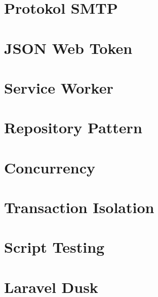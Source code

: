 	\section{Protokol SMTP}
    
	\section{JSON Web Token}
    
   \section{Service Worker}
   
   \section{Repository Pattern}
   
   \section{Concurrency}
   
   \section{Transaction Isolation}
   
   \section{Script Testing}
   
   \section{Laravel Dusk}
   
   

